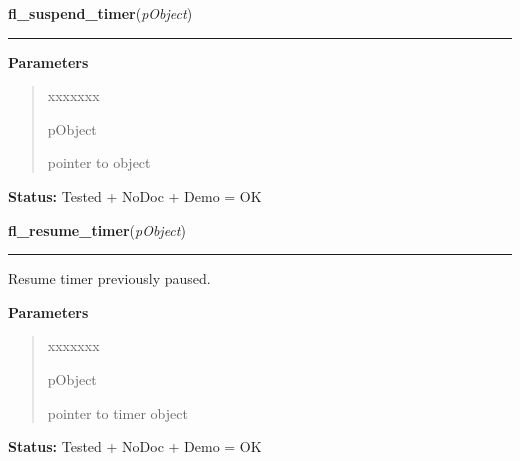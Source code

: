 \hspace{.8\funcindent}\begin{boxedminipage}{\funcwidth}

    \raggedright \textbf{fl\_suspend\_timer}(\textit{pObject})

    \vspace{-1.5ex}

    \rule{\textwidth}{0.5\fboxrule}
\setlength{\parskip}{2ex}
\setlength{\parskip}{1ex}
      \textbf{Parameters}
      \vspace{-1ex}

      \begin{quote}
        \begin{Ventry}{xxxxxxx}

          \item[pObject]

          pointer to object

        \end{Ventry}

      \end{quote}

\textbf{Status:} Tested + NoDoc + Demo = OK



    \end{boxedminipage}

    \label{xformslib:library:fl_resume_timer}

    \vspace{0.5ex}

\hspace{.8\funcindent}\begin{boxedminipage}{\funcwidth}

    \raggedright \textbf{fl\_resume\_timer}(\textit{pObject})

    \vspace{-1.5ex}

    \rule{\textwidth}{0.5\fboxrule}
\setlength{\parskip}{2ex}
    Resume timer previously paused.

\setlength{\parskip}{1ex}
      \textbf{Parameters}
      \vspace{-1ex}

      \begin{quote}
        \begin{Ventry}{xxxxxxx}

          \item[pObject]

          pointer to timer object

        \end{Ventry}

      \end{quote}

\textbf{Status:} Tested + NoDoc + Demo = OK



    \end{boxedminipage}

